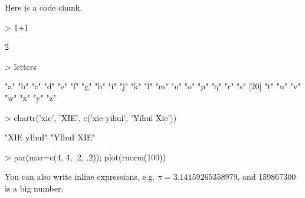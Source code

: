 \documentclass{article}
\begin{document}


Here is a code chunk.

\begin{Schunk}
\begin{Sinput}
> 1+1
\end{Sinput}
\begin{Soutput}
[1] 2
\end{Soutput}
\begin{Sinput}
> letters
\end{Sinput}
\begin{Soutput}
 [1] "a" "b" "c" "d" "e" "f" "g" "h" "i" "j" "k" "l" "m" "n" "o" "p" "q" "r" "s"
[20] "t" "u" "v" "w" "x" "y" "z"
\end{Soutput}
\begin{Sinput}
> chartr('xie', 'XIE', c('xie yihui', 'Yihui Xie'))
\end{Sinput}
\begin{Soutput}
[1] "XIE yIhuI" "YIhuI XIE"
\end{Soutput}
\begin{Sinput}
> par(mar=c(4, 4, .2, .2)); plot(rnorm(100))
\end{Sinput}
\end{Schunk}

You can also write inline expressions, e.g. $\pi=3.14159265358979$, and 159867300 is a big number.
\end{document}
